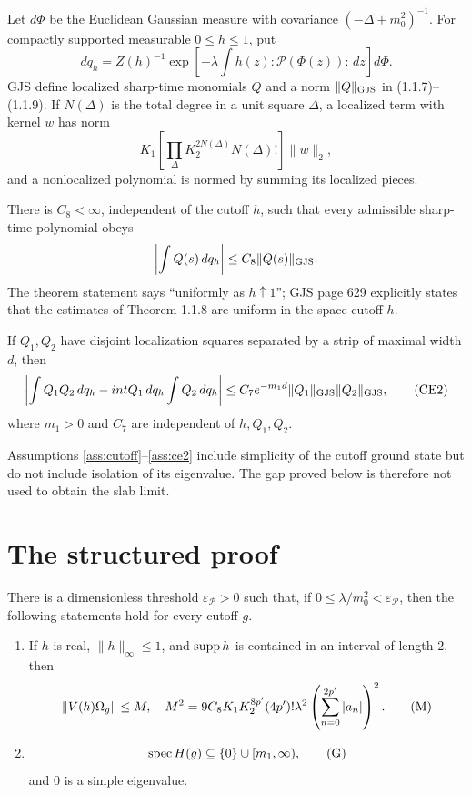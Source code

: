 \documentclass[11pt,a4paper]{article}
\begin{document}
Let $d\Phi$ be the Euclidean Gaussian measure with covariance
$(-\Delta+m_0^2)^{-1}$.  For compactly supported measurable $0\leq h\leq1$, put
\[
 dq_h=Z(h)^{-1}\exp\!\left[-\lambda\int h(z){:}\mathscr P(\Phi(z)){:}\,dz\right]d\Phi.
\]
GJS define localized sharp-time monomials $Q$ and a norm $\|Q\|_{\rm GJS}$ in
(1.1.7)--(1.1.9).  If $N(\Delta)$ is the total degree in a unit square $\Delta$, a
localized term with kernel $w$ has norm
\[
 K_1\left[\prod_\Delta K_2^{2N(\Delta)}N(\Delta)!\right]\|w\|_2,
\]
and a nonlocalized polynomial is normed by summing its localized pieces.

\begin{assumption}\label{ass:ce1}
There is $C_8<\infty$, independent of the cutoff $h$, such that every admissible
sharp-time polynomial obeys
\[
 \left|\int Q(s)\,dq_h\right|\leq C_8\|Q(s)\|_{\rm GJS}.
\]
The theorem statement says ``uniformly as $h\uparrow1$''; GJS page 629 explicitly
states that the estimates of Theorem 1.1.8 are uniform in the space cutoff $h$.
\end{assumption}

\begin{assumption}\label{ass:ce2}
If $Q_1,Q_2$ have disjoint localization squares separated by a strip of maximal
width $d$, then
\[
 \left|\int Q_1Q_2\,dq_h-int Q_1\,dq_h\int Q_2\,dq_h\right|
 \leq C_7e^{-m_1d}\|Q_1\|_{\rm GJS}\|Q_2\|_{\rm GJS},                 \tag{CE2}
\]
where $m_1>0$ and $C_7$ are independent of $h,Q_1,Q_2$.
\end{assumption}

\begin{remark}
Assumptions \ref{ass:cutoff}--\ref{ass:ce2} include simplicity of the cutoff ground
state but do not include isolation of its eigenvalue.  The gap proved below is therefore
not used to obtain the slab limit.
\end{remark}

\section{The structured proof}

\begin{theorem}\label{thm:EG}
There is a dimensionless threshold $\varepsilon_{\mathscr P}>0$ such that, if
$0\leq\lambda/m_0^2<\varepsilon_{\mathscr P}$, then the following statements hold
for every cutoff $g$.

\begin{enumerate}[label=\textup{(\roman*)}]
\item If $h$ is real, $\|h\|_\infty\leq1$, and $\operatorname{supp} h$ is contained in an
interval of length $2$, then
\[
 \|V(h)\Omega_g\|\leq M,
 \quad
 M^2=9C_8K_1K_2^{8p'}(4p')!\lambda^2
       \left(\sum_{n=0}^{2p'}|a_n|\right)^2.                         \tag{M}
\]
\item
\[
 \operatorname{spec} H(g)\subseteq\{0\}\cup[m_1,\infty),                         \tag{G}
\]
and $0$ is a simple eigenvalue.
\end{enumerate}
\end{theorem}
\end{document}
